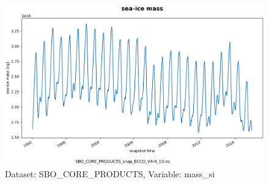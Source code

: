\begin{figure}[H]
\centering
\includegraphics[scale=0.55]{../images/plots/oneD_plots/SBO_Core_Products/mass_si.png}
\caption{Dataset: SBO\_CORE\_PRODUCTS, Variable: mass\_si}
\label{tab:table-SBO_CORE_PRODUCTS_mass_si-Plot}
\end{figure}
\newpage
\pagebreak
